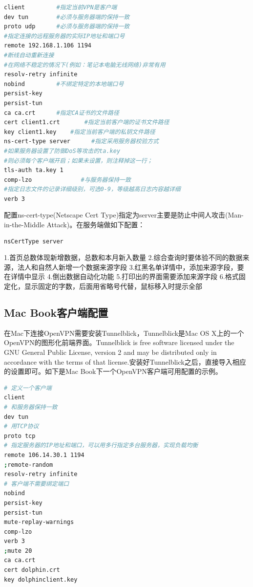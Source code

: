 \documentclass[letter]{book}
\begin{document}
\begin{lstlisting}[language=Bash]
client         #指定当前VPN是客户端
dev tun        #必须与服务器端的保持一致
proto udp      #必须与服务器端的保持一致
#指定连接的远程服务器的实际IP地址和端口号
remote 192.168.1.106 1194      
#断线自动重新连接
#在网络不稳定的情况下(例如：笔记本电脑无线网络)非常有用
resolv-retry infinite
nobind         #不绑定特定的本地端口号
persist-key
persist-tun
ca ca.crt      #指定CA证书的文件路径
cert client1.crt       #指定当前客户端的证书文件路径
key client1.key    #指定当前客户端的私钥文件路径
ns-cert-type server      #指定采用服务器校验方式
#如果服务器设置了防御DoS等攻击的ta.key
#则必须每个客户端开启；如果未设置，则注释掉这一行；
tls-auth ta.key 1     
comp-lzo              #与服务器保持一致
#指定日志文件的记录详细级别，可选0-9，等级越高日志内容越详细
verb 3                
\end{lstlisting}

配置ns-cert-type(Netscape Cert Type)指定为server主要是防止中间人攻击(Man-in-the-Middle Attack)。在服务端做如下配置：

\begin{lstlisting}[language=Bash]
nsCertType server
\end{lstlisting}

1.首页总数体现新增数据，总数和本月新入数量
2.综合查询时要体验不同的数据来源，法人和自然人新增一个数据来源字段
3.红黑名单详情中，添加来源字段，要在详情中显示
4.倒出数据自动化功能
5.打印出的界面需要添加来源字段
6.格式固定化，显示固定的字数，后面用省略号代替，鼠标移入时提示全部

\subsection{Mac Book客户端配置}

在Mac下连接OpenVPN需要安装Tunnelblick，Tunnelblick是Mac OS X上的一个OpenVPN的图形化前端界面。Tunnelblick is free software licensed under the GNU General Public License, version 2 and may be distributed only in accordance with the terms of that license.安装好Tunnelblick之后，直接导入相应的设置即可。如下是Mac Book下一个OpenVPN客户端可用配置的示例。

\begin{lstlisting}[language=Bash]
# 定义一个客户端
client
# 和服务器保持一致
dev tun
# 用TCP协议
proto tcp
# 指定服务器的IP地址和端口，可以用多行指定多台服务器，实现负载均衡
remote 106.14.30.1 1194
;remote-random
resolv-retry infinite
# 客户端不需要绑定端口
nobind
persist-key
persist-tun
mute-replay-warnings
comp-lzo
verb 3
;mute 20
ca ca.crt
cert dolphin.crt
key dolphinclient.key
\end{lstlisting}
\end{document}

